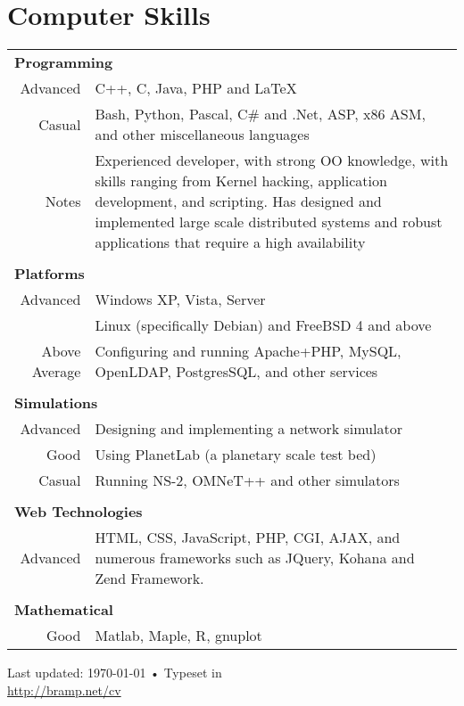 \documentclass[a4paper,10pt]{article}
\begin{document}
\section{Computer Skills}
\begin{tabular}{rp{12cm}}

\multicolumn{2}{l}{\textbf{Programming}} \\
Advanced & C++, C, Java, PHP and \LaTeX \\
Casual   & Bash, Python, Pascal, C\# and .Net, ASP, x86 ASM, and other miscellaneous languages \\
Notes    & Experienced developer, with strong OO knowledge, with skills ranging from Kernel hacking, application development, and scripting. Has designed and implemented large scale distributed systems and robust applications that require a high availability\\

\\
\multicolumn{2}{l}{\textbf{Platforms}} \\
Advanced       & Windows XP, Vista, Server\\
               & Linux (specifically Debian) and FreeBSD 4 and above\\
Above Average  & Configuring and running Apache+PHP, MySQL, OpenLDAP, PostgresSQL, and other services\\

\\
\multicolumn{2}{l}{\textbf{Simulations}} \\
Advanced & Designing and implementing a network simulator\\
Good     & Using PlanetLab (a planetary scale test bed)\\
Casual   & Running NS-2, OMNeT++ and other simulators\\

\\
\multicolumn{2}{l}{\textbf{Web Technologies}} \\
Advanced & HTML, CSS, JavaScript, PHP, CGI, AJAX, and numerous frameworks such as JQuery, Kohana and Zend Framework.\\

\\
\multicolumn{2}{l}{\textbf{Mathematical}} \\
Good & Matlab, Maple, R, gnuplot\\

\end{tabular}


\vfill{}

\begin{center}
{\scriptsize  Last updated: \today\- •\- 
Typeset in \XeLaTeX\\
\href{http://bramp.net/cv}{http://bramp.net/cv}}
\end{center}
\end{document}
